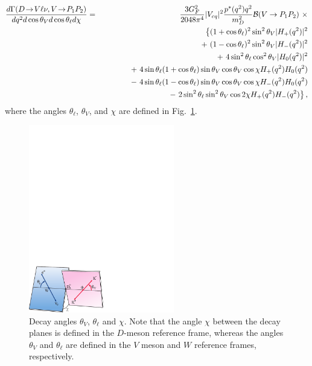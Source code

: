 \begin{eqnarray}
\frac{d\Gamma(D\ra V\ell\nu, V\ra P_1P_2)}{dq^2 d\cos\theta_V d\cos\theta_\ell d\chi} 
 &  = & \frac{3G_F^2}{2048\pi^4}
       |V_{cq}|^2 \frac{p^*(q^2)q^2}{m_D^2} {\cal B}(V\to P_1P_2)\ \times \nonumber \\ 
 & & \hskip0.10in \big\{ (1 + \cos\theta_\ell)^2 \sin^2\theta_V |H_+(q^2)|^2 \nonumber \\
 & & \hskip0.20in +\ (1 - \cos\theta_\ell)^2 \sin^2\theta_V |H_-(q^2)|^2 \nonumber \\
 & & \hskip0.30in +\ 4\sin^2\theta_\ell\cos^2\theta_V|H_0(q^2)|^2 \nonumber \\
 & & \hskip0.40in +\ 4\sin\theta_\ell (1 + \cos\theta_\ell) 
             \sin\theta_V \cos\theta_V \cos\chi H_+(q^2) H_0(q^2) \nonumber \\
 & & \hskip0.50in -\ 4\sin\theta_\ell (1 - \cos\theta_\ell) 
          \sin\theta_V \cos\theta_V \cos\chi H_-(q^2) H_0(q^2) \nonumber \\
 & & \hskip0.60in -\ 2\sin^2\theta_\ell \sin^2\theta_V 
                \cos 2\chi H_+(q^2) H_-(q^2) \big\}\,,
\label{eq:dGammaVector}
\end{eqnarray}
where the angles $\theta^{}_\ell$, $\theta^{}_V$, and $\chi$ are defined
in Fig.~\ref{DecayAngles}. 

\begin{figure}[htbp]
  \begin{center}
\includegraphics[width=2.5in, bb=0 0 320 200]{figures/charm/sl_Widhalm07_3.pdf}
  \end{center}
  \caption{
    Decay angles $\theta_V$, $\theta_\ell$ 
    and $\chi$. Note that the angle $\chi$ between the decay
    planes is defined in the $D$-meson reference frame, whereas
    the angles $\theta^{}_V$ and $\theta^{}_\ell$ are defined
    in the $V$ meson and $W$ reference frames, respectively.}
  \label{DecayAngles}
\end{figure}

